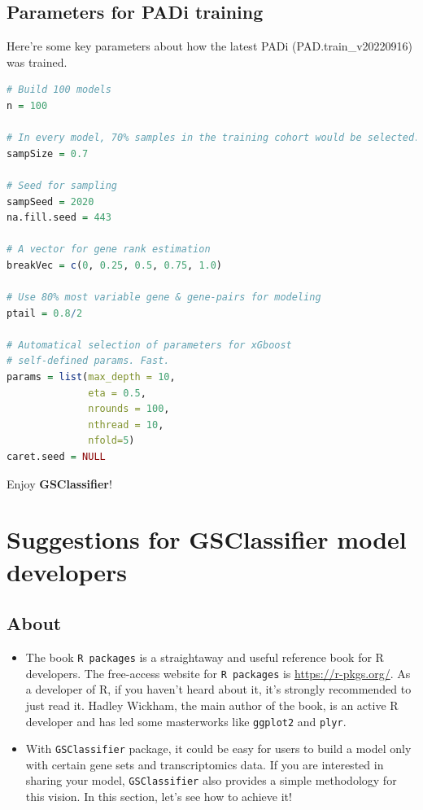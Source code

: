 \documentclass[
  12pt,
]{book}
\newcommand{\passthrough}[1]{#1}
\begin{document}
\hypertarget{padiPara}{%
\section{Parameters for PADi training}\label{padiPara}}

Here're some key parameters about how the latest PADi (PAD.train\_v20220916) was trained.

\begin{lstlisting}[language=R]
# Build 100 models
n = 100

# In every model, 70% samples in the training cohort would be selected.
sampSize = 0.7

# Seed for sampling
sampSeed = 2020
na.fill.seed = 443

# A vector for gene rank estimation
breakVec = c(0, 0.25, 0.5, 0.75, 1.0)

# Use 80% most variable gene & gene-pairs for modeling
ptail = 0.8/2

# Automatical selection of parameters for xGboost
# self-defined params. Fast.
params = list(max_depth = 10,
              eta = 0.5,
              nrounds = 100,
              nthread = 10,
              nfold=5)
caret.seed = NULL
\end{lstlisting}

Enjoy \textbf{GSClassifier}!

\hypertarget{suggestions-for-gsclassifier-model-developers}{%
\chapter{Suggestions for GSClassifier model developers}\label{suggestions-for-gsclassifier-model-developers}}

\hypertarget{about-3}{%
\section{About}\label{about-3}}

\begin{itemize}
\item
  The book \passthrough{\lstinline!R packages!} is a straightaway and useful reference book for R developers. The free-access website for \passthrough{\lstinline!R packages!} is \url{https://r-pkgs.org/}. As a developer of R, if you haven't heard about it, it's strongly recommended to just read it. Hadley Wickham, the main author of the book, is an active R developer and has led some masterworks like \passthrough{\lstinline!ggplot2!} and \passthrough{\lstinline!plyr!}.
\item
  With \passthrough{\lstinline!GSClassifier!} package, it could be easy for users to build a model only with certain gene sets and transcriptomics data. If you are interested in sharing your model, \passthrough{\lstinline!GSClassifier!} also provides a simple methodology for this vision. In this section, let's see how to achieve it!
\end{itemize}
\end{document}
